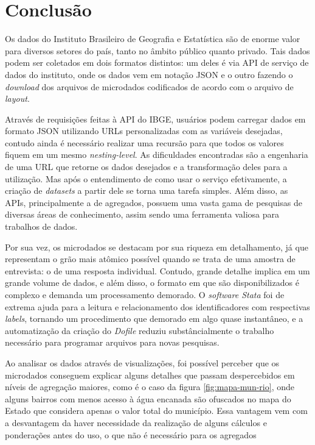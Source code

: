 \chapter{Conclusão}

Os dados do Instituto Brasileiro de Geografia e Estatística são de enorme valor
para diversos setores do país, tanto no âmbito público quanto privado. Tais dados podem ser coletados em dois formatos distintos: um deles é via API de serviço de dados do instituto, onde os dados vem em notação JSON e o outro fazendo o \textit{download} dos arquivos de microdados codificados de acordo com o arquivo de \textit{layout}.

Através de requisições feitas à API do IBGE, usuários podem carregar dados em formato JSON utilizando URLs personalizadas com as variáveis desejadas, contudo ainda é necessário realizar uma recursão para que todos os valores fiquem em um mesmo \textit{nesting-level}. As dificuldades encontradas são a engenharia de uma URL que retorne os dados desejados e a transformação deles para a utilização. Mas após o entendimento de como usar o serviço efetivamente, a criação de \textit{datasets} a partir dele se torna uma tarefa simples. Além disso, as APIs, principalmente a de agregados, possuem uma vasta gama de pesquisas de diversas áreas de conhecimento, assim sendo uma ferramenta valiosa para trabalhos de dados.

Por sua vez, os microdados se destacam por sua riqueza em detalhamento, já que representam o grão mais atômico possível quando se trata de uma amostra de entrevista: o de uma resposta individual. Contudo, grande detalhe implica em um grande volume de dados, e além disso, o formato em que são disponibilizados é complexo e demanda um processamento demorado. O \textit{software Stata} foi de extrema ajuda para a leitura e relacionamento dos identificadores com respectivas \textit{labels}, tornando um procedimento que demorado em algo quase instantâneo, e a automatização da criação do \textit{Dofile} reduziu substâncialmente o trabalho necessário para programar arquivos para novas pesquisas.

Ao analisar os dados através de visualizações, foi possível perceber que os microdados conseguem explicar alguns detalhes que passam despercebidos em níveis de agregação maiores, como é o caso da figura \ref{fig:mapa-mun-rio}, onde alguns bairros com menos acesso à água encanada são ofuscados no mapa do Estado que considera apenas o valor total do município. Essa vantagem vem com a desvantagem da haver necessidade da realização de alguns cálculos e ponderações antes do uso, o que não é necessário para os agregados

